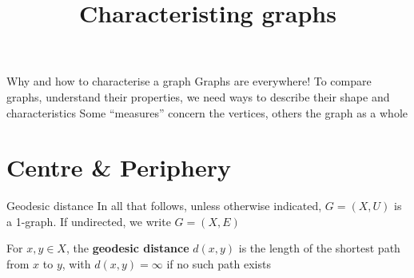 \documentclass[aspectratio=43]{beamer}
\title{Characteristing graphs}
\date{}
\begin{document}
\begin{frame}
	\titlepage
\end{frame}


\begin{frame}{Why and how to characterise a graph}
Graphs are everywhere!
\vfill
To compare graphs, understand their properties, we need ways to describe their shape and characteristics
\vfill
Some ``measures'' concern the vertices, others the graph as a whole
\vfill
\end{frame}



\section{Centre \& Periphery}

\begin{frame}{Geodesic distance}
In all that follows, unless otherwise indicated, 
$G=(X,U)$ is a 1-graph. If undirected, we write $G=(X,E)$
\vfill
\begin{definition}
For $x,y\in X$, the \textbf{geodesic distance} $d(x,y)$ is the length of the shortest path from $x$ to $y$, with $d(x,y)=\infty$ if no such path exists
\end{definition}
\vfill
\end{frame}
\end{document}
